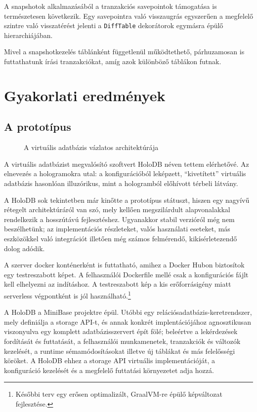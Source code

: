 \documentclass[
    parspace,
    noindent,
    nohyp,
]{elteiktdk}[2023/04/10]
\begin{document}
A snapshotok alkalmazásából a tranzakciós savepointok támogatása is természetesen következik.
Egy savepointra való visszaugrás egyszerűen a megfelelő szintre való visszatérést jelenti
a \texttt{DiffTable} dekorátorok egymásra épülő hierarchiájában.

Mivel a snapshotkezelés táblánként függetlenül működtethető,
párhuzamosan is futtathatunk írási tranzakciókat,
amíg azok különböző táblákon futnak.


\chapter{Gyakorlati eredmények}

\section{A prototípus}

\begin{figure}[H]
\centering

\caption{A virtuális adatbázis vázlatos architektúrája}
\end{figure}

A virtuális adatbázist megvalósító szoftvert HoloDB néven tettem elérhetővé.
Az elnevezés a hologramokra utal:
a konfigurációból leképzett, ``kivetített'' virtuális adatbázis hasonlóan illuzórikus,
mint a hologramból előhívott térbeli látvány.

A HoloDB sok tekintetben már kinőtte a prototípus státuszt,
hiszen egy nagyívű rétegelt architektúráról van szó,
mely kellően megszilárdult alapvonalakkal rendelkezik a hosszútávú fejlesztéshez.
Ugyanakkor stabil verzióról még nem beszélhetünk;
az implementációs részleteket, valós használati eseteket,
más eszközökkel való integrációt illetően még számos felmérendő, kikísérletezendő dolog adódik.

A szerver docker konténerként is futtatható, amihez a Docker Hubon biztosítok egy testreszabott képet.
A felhasználói Dockerfile mellé csak a konfigurációs fájlt kell elhelyezni az indításhoz.
A testreszabott kép a kis erőforrásigény miatt serverless végpontként is jól használható.\footnote{
    Későbbi terv egy erősen optimalizált, GraalVM-re épülő képváltozat fejlesztése.
}

A HoloDB a MiniBase projektre épül.
Utóbbi egy relációsadatbázis-keretrendszer, mely definiálja a storage API-t,
és annak konkrét implentációjához agnosztikusan viszonyulva
egy komplett adatbázisszervert épít fölé;
beleértve a lekérdezések fordítását és futtatását,
a felhasználói munkamenetek, tranzakciók és változók kezelését,
a runtime sémamódosításokat illetve új táblákat és más felelősségi köröket.
A HoloDB ehhez a storage API virtuális implementációját,
a konfiguráció kezelését
és a megfelelő futtatási környezetet adja hozzá.
\end{document}
